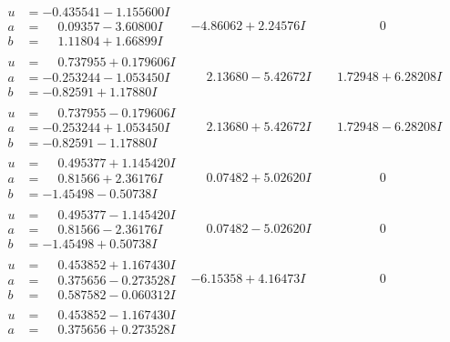 \documentclass[1p]{elsarticle_modified}
\theoremstyle{definition}
\begin{document}
$$\begin{array}{c|c|c}
 \hline 
\begin{aligned}
u &= -0.435541 - 1.155600 I \\
a &= \phantom{-}0.09357 - 3.60800 I \\
b &= \phantom{-}1.11804 + 1.66899 I\end{aligned}
 & -4.86062 + 2.24576 I & \phantom{-0.000000 } 0 \\ \hline\begin{aligned}
u &= \phantom{-}0.737955 + 0.179606 I \\
a &= -0.253244 - 1.053450 I \\
b &= -0.82591 + 1.17880 I\end{aligned}
 & \phantom{-}2.13680 - 5.42672 I & \phantom{-}1.72948 + 6.28208 I \\ \hline\begin{aligned}
u &= \phantom{-}0.737955 - 0.179606 I \\
a &= -0.253244 + 1.053450 I \\
b &= -0.82591 - 1.17880 I\end{aligned}
 & \phantom{-}2.13680 + 5.42672 I & \phantom{-}1.72948 - 6.28208 I \\ \hline\begin{aligned}
u &= \phantom{-}0.495377 + 1.145420 I \\
a &= \phantom{-}0.81566 + 2.36176 I \\
b &= -1.45498 - 0.50738 I\end{aligned}
 & \phantom{-}0.07482 + 5.02620 I & \phantom{-0.000000 } 0 \\ \hline\begin{aligned}
u &= \phantom{-}0.495377 - 1.145420 I \\
a &= \phantom{-}0.81566 - 2.36176 I \\
b &= -1.45498 + 0.50738 I\end{aligned}
 & \phantom{-}0.07482 - 5.02620 I & \phantom{-0.000000 } 0 \\ \hline\begin{aligned}
u &= \phantom{-}0.453852 + 1.167430 I \\
a &= \phantom{-}0.375656 - 0.273528 I \\
b &= \phantom{-}0.587582 - 0.060312 I\end{aligned}
 & -6.15358 + 4.16473 I & \phantom{-0.000000 } 0 \\ \hline\begin{aligned}
u &= \phantom{-}0.453852 - 1.167430 I \\
a &= \phantom{-}0.375656 + 0.273528 I \\

\end{aligned}
\end{array}$$
\end{document}
